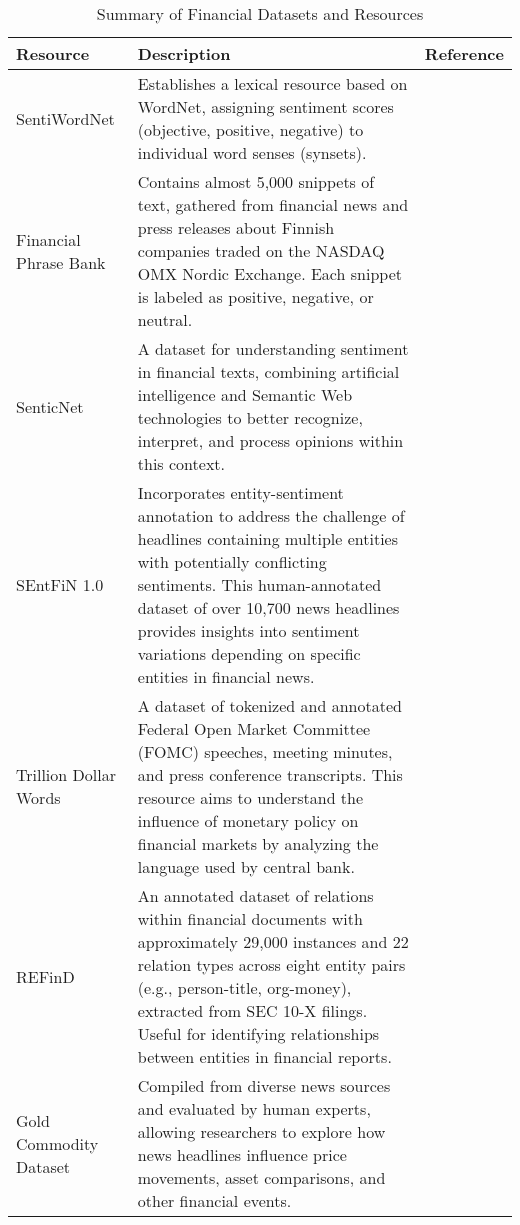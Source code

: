 \begin{table}[!h]
\footnotesize
    \centering
    \caption{Summary of Financial Datasets and Resources}
    \begin{tabular}{|p{}|p{}|p{}|}
        \hline
        \textbf{Resource} & \textbf{Description} & \textbf{Reference} \\ \hline
        SentiWordNet & Establishes a lexical resource based on WordNet, assigning sentiment scores (objective, positive, negative) to individual word senses (synsets). & \cite{baccianella2010sentiwordnet} \\ \hline
        Financial Phrase Bank & Contains almost 5,000 snippets of text, gathered from financial news and press releases about Finnish companies traded on the NASDAQ OMX Nordic Exchange. Each snippet is labeled as positive, negative, or neutral. & \cite{malo2014good} \\ \hline
        SenticNet & A dataset for understanding sentiment in financial texts, combining artificial intelligence and Semantic Web technologies to better recognize, interpret, and process opinions within this context. & \cite{cambria2012senticnet} \\ \hline
        SEntFiN 1.0 & Incorporates entity-sentiment annotation to address the challenge of headlines containing multiple entities with potentially conflicting sentiments. This human-annotated dataset of over 10,700 news headlines provides insights into sentiment variations depending on specific entities in financial news. & \cite{sinha2022sentfin} \\ \hline
        Trillion Dollar Words & A dataset of tokenized and annotated Federal Open Market Committee (FOMC) speeches, meeting minutes, and press conference transcripts. This resource aims to understand the influence of monetary policy on financial markets by analyzing the language used by central bank. & \cite{shah2023trillion} \\ \hline
        REFinD & An annotated dataset of relations within financial documents with approximately 29,000 instances and 22 relation types across eight entity pairs (e.g., person-title, org-money), extracted from SEC 10-X filings. Useful for identifying relationships between entities in financial reports. & \cite{kaur2023refind} \\ \hline
        Gold Commodity Dataset & Compiled from diverse news sources and evaluated by human experts, allowing researchers to explore how news headlines influence price movements, asset comparisons, and other financial events. & \cite{sinha2021impact} \\ \hline

\end{tabular}
\end{table}
